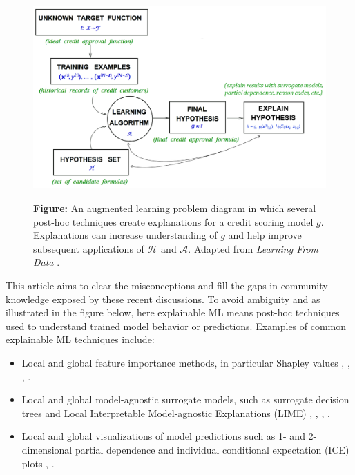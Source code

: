 \documentclass{article}
\begin{document}
\begin{figure}[htb]
	\begin{center}
		\includegraphics[scale=0.33]{img/figure_1.png}
		\label{fig:learning_problem}
		\captionsetup{labelformat=empty}
		\caption{\textbf{Figure:} An augmented learning problem diagram in which several post-hoc techniques create explanations for a credit scoring model $g$. Explanations can increase understanding of $g$ and help improve subsequent applications of $\mathcal{H}$ and $\mathcal{A}$. Adapted from \textit{Learning From Data} \cite{lfd}.}
	\end{center}
\end{figure}	

This article aims to clear the misconceptions and fill the gaps in community knowledge exposed by these recent discussions. To avoid ambiguity and as illustrated in the figure below, here explainable ML means post-hoc techniques used to understand trained model behavior or predictions. Examples of common explainable ML techniques include:

\begin{itemize}
\item Local and global feature importance methods, in particular Shapley values \cite{shapley1988shapley}, \cite{keinan2004fair}, \cite{kononenko2010efficient}, \cite{shapley}.
\item Local and global model-agnostic surrogate models, such as surrogate decision trees and Local Interpretable Model-agnostic Explanations (LIME) \cite{dt_surrogate1}, \cite{dt_surrogate2}, \cite{lime-sup}, \cite{lime}. 
\item Local and global visualizations of model predictions such as 1- and 2-dimensional partial dependence and individual conditional expectation (ICE) plots \cite{esl}, \cite{ice_plots}.
\end{itemize}
\end{document}
